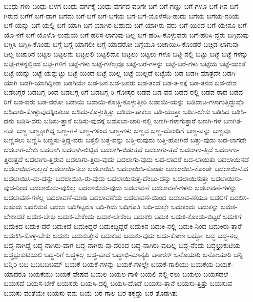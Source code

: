 {ಬಂಧು-ಗಳು
ಬಂಧು-ಬಳಗ
ಬಂಧು-ವರ್ಗಕ್ಕೆ
ಬಂಧು-ವರ್ಗದ-ವರಿಗೇ
ಬಗೆ
ಬಗೆ-ಗಣ್ಣು
ಬಗೆ-ಗಳೂ
ಬಗೆ-ಗಿನ
ಬಗೆ-ಗಿರುವ
ಬಗೆಗೆ
ಬಗೆ-ದಾಗ
ಬಗೆದು
ಬಗೆ-ಬಗೆ
ಬಗೆ-ಬಗೆಯ
ಬಗೆ-ಬಗೆ-ಯೊಳೆಸೆದಿ-ಹುದು
ಬಗೆಯ
ಬಗೆಯ-ನರಿಯೆ
ಬಗೆ-ಯನ್ನು
ಬಗೆ-ಯಲ್ಲಿ
ಬಗೆ-ಯಾಗಿ
ಬಗೆ-ಯಾಗಿರ-ಬಹುದು
ಬಗೆ-ಯಾಗಿರು-ವರು
ಬಗೆ-ಯಿಂದ
ಬಗೆ-ಯೇನೂ
ಬಗೆ-ಯೊ-ಳಗೆ
ಬಗೆ-ಯೊಳೊ-ಲುಮೆಯ
ಬಗೆ-ಹರಿಸ-ಲಾಗುವು-ದಿಲ್ಲ
ಬಗೆ-ಹರಿಸಿ-ಕೊಳ್ಳುವರು
ಬಗೆ-ಹರಿಸಿ-ದ್ದರು
ಬಗ್ಗಿದುವು
ಬಗ್ಗಿಸಿ
ಬಗ್ಗಿಸಿ-ಕೊಂಡು
ಬಗ್ಗೆ
ಬಗ್ಗೆ-ಯಾಗಲೀ
ಬಗ್ಗೆ-ಯಾದರೋ
ಬಗ್ಗೆಯೂ
ಬಚಾಯಿಸಿ-ಕೊಂಡರೆ
ಬಚ್ಚಿಡ-ಲಾಗುವು-ದಿಲ್ಲ
ಬಜಾರಿನ
ಬಟ್ಟಲ
ಬಟ್ಟಲನು
ಬಟ್ಟಲಲಿ
ಬಟ್ಟಲಿದೊ
ಬಟ್ಟಲು
ಬಟ್ಟಲು-ಗಳೂ
ಬಟ್ಟಿ-ನಲ್ಲಿ
ಬಟ್ಟು
ಬಟ್ಟೆ
ಬಟ್ಟೆ-ಗಳನ್ನು
ಬಟ್ಟೆ-ಗಳನ್ನೆಲ್ಲಿಂದ
ಬಟ್ಟೆ-ಗಳಿಗೆ
ಬಟ್ಟೆ-ಗಳು
ಬಟ್ಟೆ-ಗಳೆಲ್ಲವೂ
ಬಟ್ಟೆ-ಬರೆ-ಗಳನ್ನು
ಬಟ್ಟೆ-ಬರೆ-ಗಳು
ಬಟ್ಟೆಯ
ಬಟ್ಟೆ-ಯಂತೆ
ಬಟ್ಟೆ-ಯನ್ನು
ಬಟ್ಟೆ-ಯನ್ನುಟ್ಟು
ಬಟ್ಟೆ-ಯಿಂದ
ಬಟ್ಟೆ-ಯಿಲ್ಲ
ಬಟ್ಟೆ-ಯಿಲ್ಲದೆ
ಬಟ್ಟೆಯೆ
ಬಡ
ಬಡಗಿ-ಮಾತ್ರವೇ
ಬಡಗಿ-ಯಾಗಿ
ಬಡಗಿ-ಯಾಗಿದ್ದೀರಾ
ಬಡಗಿಯೇ
ಬಡ-ಜನ
ಬಡ-ಜನರು
ಬಡ-ತಂದೆ
ಬಡ-ತ-ನಕ್ಕೆ
ಬಡ-ತನದ
ಬಡ-ದೇಶ
ಬಡಬಗ್ಗರ
ಬಡಬಗ್ಗ-ರಿಂದ
ಬಡಬಗ್ಗ-ರಿಗೆ
ಬಡಬಗ್ಗ-ರಿ-ಗೋಸ್ಕರ
ಬಡವ
ಬಡ-ವನ
ಬಡವ-ರಲ್ಲಿ
ಬಡವ-ರಾದ
ಬಡವ-ರಿಗೆ
ಬಡ-ವರು
ಬಡ-ವರೋ
ಬಡಾಯಿ
ಬಡಾಯಿ-ಕೊಚ್ಚಿ-ಕೊಳ್ಳುತ್ತೀರಿ
ಬಡಾಯಿ-ಯನ್ನು
ಬಡಿದಾಟ-ಗಳಾಗುತ್ತಿದ್ದುವೊ
ಬಡಿದಾಡಿ-ಕೊಳ್ಳುವುದಕ್ಕಿಂತಲೂ
ಬಡಿದು-ಕೊಳ್ಳುತ್ತಿತ್ತು
ಬಡಿದು-ಹಾಕಲು
ಬಡಿ-ಯುತ್ತಾ
ಬಡಿಸ-ಬೇಕು
ಬಡಿಸಿದ
ಬಡಿಸಿ-ದನು
ಬಡಿಸಿ-ದರು
ಬಡಿಸು-ತ್ತಾನೆ
ಬಡಿಸು-ವುದಕ್ಕೆ
ಬಡೊಬಾ-ಜಾರಿ-ನಲ್ಲಿ
ಬಣಗಿ-ಗಳಾಗುತ್ತಾರೆ
ಬಣಗಿ-ಗಳೆ
ಬಣಗಿತ-ನವೇ
ಬಣ್ಣ
ಬಣ್ಣಕ್ಕಾಗಿದ್ದ
ಬಣ್ಣ-ಗಳ
ಬಣ್ಣ-ಗಳಿಂದ
ಬಣ್ಣ-ಗಳು
ಬಣ್ಣದ
ಬಣ್ಣ-ದೊಂದಿಗೆ
ಬಣ್ಣ-ವನ್ನು
ಬಣ್ಣವೂ
ಬಣ್ಣಿಸಲು
ಬಣ್ಣಿಸಿ
ಬಣ್ಣಿಸು-ತ್ತಿದ್ದ-ವರು
ಬತ್ತಲಿ
ಬತ್ತ-ವನ್ನು
ಬತ್ತಿ-ರುವುದು
ಬತ್ತಿ-ಹೋಗಿದೆ
ಬತ್ತು-ವುದು
ಬದ-ಲಾಗದೇ
ಬದಲಾಗ-ಬೇಕು
ಬದಲಾಗಿ
ಬದಲಾಗಿ-ಬಿಟ್ಟಿವೆ
ಬದಲಾಗಿ-ಬಿಡುತ್ತದೆ
ಬದಲಾಗು-ತ್ತದೆ
ಬದಲಾಗು-ತ್ತಿದೆ
ಬದಲಾಗು-ತ್ತಿರುತ್ತದೆ
ಬದಲಾಗು-ತ್ತಿರುವ
ಬದಲಾಗು-ತ್ತಿರು-ವುದು
ಬದಲಾಗು-ವುದು
ಬದ-ಲಾದರೆ
ಬದ-ಲಾಯಿತು
ಬದಲಾಯಿಸದೆ
ಬದಲಾಯಿಸ-ಬಲ್ಲದೆ
ಬದಲಾಯಿ-ಸಲು
ಬದಲಾಯಿಸಿ
ಬದಲಾಯಿಸಿ-ಕೊಂಡು
ಬದಲಾಯಿಸಿ-ಕೊಂಡೇ
ಬದಲಾಯಿ-ಸಿದ
ಬದಲಾಯಿಸಿ-ದು-ದನ್ನು
ಬದಲಾಯಿಸಿ-ರು-ವುದು
ಬದಲಾಯಿಸುತ್ತ-ದೆಂಬು-ದನ್ನು
ಬದಲಾಯಿಸುತ್ತಾ
ಬದಲಾಯಿಸು-ವುದ-ರಿಂದ
ಬದಲಾಯಿಸು-ವುದಿಲ್ಲ
ಬದಲಾಯಿಸು-ವುದು
ಬದಲಾವಣೆ
ಬದಲಾವಣೆ-ಗಳನು
ಬದಲಾವಣೆ-ಗಳನ್ನು
ಬದಲಾವಣೆ-ಗಳೆಲ್ಲ
ಬದಲಾವಣೆ-ಮಾಡಿ
ಬದಲಾವಣೆಯ
ಬದಲಾವಣೆ-ಯಿಂದ
ಬದಲಾವ-ಣೆಯೂ
ಬದಲಿಗೆ
ಬದಲಿಸ-ಬಹುದು
ಬದಲಿಸುತ
ಬದಲು
ಬದಿಗಿಟ್ಟರೂ
ಬದಿ-ಗಿಡು
ಬದಿಗೊತ್ತಿ
ಬದಿ-ಯಲ್ಲೇ
ಬದುಕಂದು
ಬದುಕನ್ನು
ಬದುಕ-ಬೇಕಾದರೆ
ಬದುಕ-ಬೇಕು
ಬದುಕ-ಬೇಕೆಂದು
ಬದುಕ-ಬೇಕೆಂಬ
ಬದುಕಲಿ
ಬದುಕಿ
ಬದುಕಿ-ಕೊಂಡು-ಬಿಟ್ಟರೆ
ಬದುಕಿಗೆ
ಬದುಕಿದ
ಬದುಕಿ-ದರೆ
ಬದುಕಿದೆ
ಬದುಕಿದ್ದರೆ
ಬದುಕಿದ್ದಿದ್ದರೆ
ಬದುಕಿನ
ಬದುಕಿ-ನಲ್ಲಿ
ಬದುಕಿ-ನಿಂದ
ಬದುಕಿರು-ತ್ತಾರೆ
ಬದುಕಿಸಿ-ಕೊಳ್ಳ-ಬೇಕು
ಬದುಕು
ಬದುಕುತ್ತೇನೆ
ಬದುಕುವ
ಬದುಕು-ವುದು
ಬದು-ಕೋಣ
ಬದ್ದೋ
ಬದ್ಧ
ಬದ್ಧ-ನಲ್ಲ
ಬದ್ಧ-ನಾಗಿದ್ದೆ
ಬದ್ಧ-ನಾಗಿರು-ವಾಗ
ಬದ್ಧ-ನಾಗಿರು-ವು-ದರಿಂದ
ಬದ್ಧ-ನಾಗಿರು-ವುದಿಲ್ಲ
ಬದ್ಧ-ನೆಂದು
ಬದ್ಧಭ್ರುಕುಟಿಯ
ಬದ್ಧಭ್ರುಕುಟಿಯಲಿ
ಬದ್ಧ-ರಿಗೆ
ಬದ್ಧಳಲ್ಲ
ಬದ್ಧ-ವಾದ
ಬದ್ಧಾಭಿ-ಮಾನ್ಯಪಿ
ಬನಾರಸ್
ಬನೊಯಾರಿ
ಬನೋಯಾರಿ
ಬನ್ನಿ
ಬನ್ನಿರಿ
ಬಬ
ಬಬಬಬಬಮ್
ಬಯಕೆ
ಬಯಕೆ-ಗಳನ್ನು
ಬಯಕೆ-ಗಳಲ್ಲೇ
ಬಯಕೆ-ಗಾಲಿಯು
ಬಯಕೆಯ
ಬಯಕೆ-ಯಾದರೂ
ಬಯಕೆಯು
ಬಯಕೆ-ವೇಷವ
ಬಯಲ
ಬಯಲ-ಗಾಳಿ
ಬಯಲಿ-ನಲ್ಲಿ-ರಲು
ಬಯಲು
ಬಯಸದಲೆ
ಬಯಸದೆ
ಬಯಸ-ಬೇಕೆ
ಬಯಸರು
ಬಯಸಿ-ದಲ್ಲಿ
ಬಯಸಿ-ದೊಡೆ
ಬಯಸು-ತ್ತಾನೆ
ಬಯಸು-ತ್ತಿತ್ತು
ಬಯಸುವ
ಬಯಸು-ವಂತೆಯೇ
ಬಯಸು-ವನು
ಬಯೆ
ಬರ-ಗಾಲ
ಬರ-ತಕ್ಕದ್ದು
ಬರ-ತೊಡಗಿತು
}
